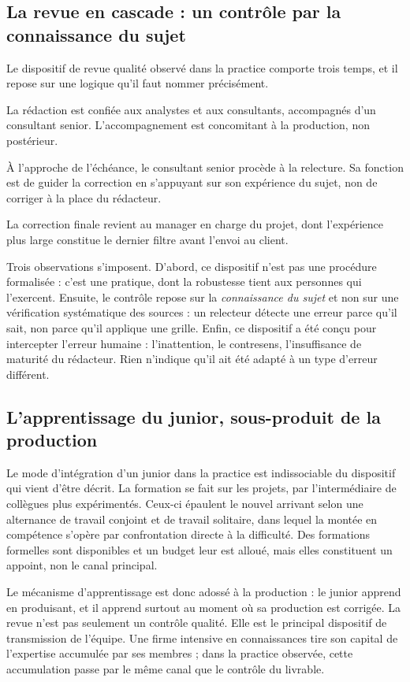 \subsection{La revue en cascade : un contrôle par la connaissance du sujet}

Le dispositif de revue qualité observé dans la practice comporte trois temps, et il repose
sur une logique qu'il faut nommer précisément.

La rédaction est confiée aux analystes et aux consultants, accompagnés d'un consultant
senior. L'accompagnement est concomitant à la production, non postérieur.

À l'approche de l'échéance, le consultant senior procède à la relecture. Sa fonction est
de guider la correction en s'appuyant sur son expérience du sujet, non de corriger à la
place du rédacteur.

La correction finale revient au manager en charge du projet, dont l'expérience plus large
constitue le dernier filtre avant l'envoi au client.

Trois observations s'imposent. D'abord, ce dispositif n'est pas une procédure formalisée :
c'est une pratique, dont la robustesse tient aux personnes qui l'exercent. Ensuite, le
contrôle repose sur la \emph{connaissance du sujet} et non sur une vérification
systématique des sources : un relecteur détecte une erreur parce qu'il sait, non parce
qu'il applique une grille. Enfin, ce dispositif a été conçu pour intercepter l'erreur
humaine : l'inattention, le contresens, l'insuffisance de maturité du rédacteur. Rien
n'indique qu'il ait été adapté à un type d'erreur différent.

\subsection{L'apprentissage du junior, sous-produit de la production}

Le mode d'intégration d'un junior dans la practice est indissociable du dispositif qui
vient d'être décrit. La formation se fait sur les projets, par l'intermédiaire de collègues
plus expérimentés. Ceux-ci épaulent le nouvel arrivant selon une alternance de travail
conjoint et de travail solitaire, dans lequel la montée en compétence s'opère par
confrontation directe à la difficulté. Des formations formelles sont disponibles et un
budget leur est alloué, mais elles constituent un appoint, non le canal principal.

Le mécanisme d'apprentissage est donc adossé à la production : le junior apprend en
produisant, et il apprend surtout au moment où sa production est corrigée. La revue n'est
pas seulement un contrôle qualité. Elle est le principal dispositif de transmission de
l'équipe. Une firme intensive en connaissances tire son capital de l'expertise accumulée
par ses membres \cite{starbuck1992} ; dans la practice observée, cette accumulation passe
par le même canal que le contrôle du livrable.

